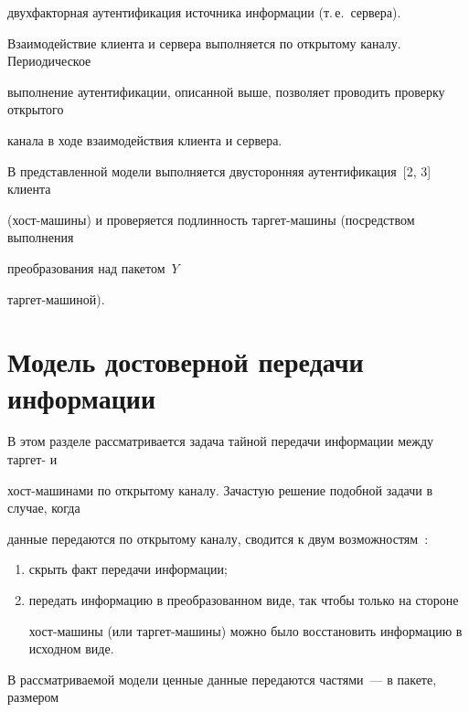 двухфакторная аутентификация источника информации (т.\,е.\ сервера).


    


    Взаимодействие клиента и сервера выполняется по открытому каналу. Периодическое 


выполнение аутентификации, описанной выше, позволяет проводить проверку открытого 


канала в ходе взаимодействия клиента и сервера.


    


    В представленной модели выполняется двусторонняя аутентификация~[2, 3] клиента 


(хост-ма\-ши\-ны) и проверяется подлинность таргет-машины (посредством выполнения 


преобразования над пакетом~$Y$ 


    тар\-гет-ма\-ши\-ной).





\section{Модель достоверной передачи информации}





    В этом разделе рассматривается задача тайной передачи информации между тар\-гет- и 


хост-машинами по открытому каналу. Зачастую решение подобной задачи в случае, когда 


данные передаются по открытому каналу, сводится к двум возможностям~\cite{8-pis}:


    \begin{enumerate}[(1)]


\item скрыть факт передачи информации;


\item передать информацию в преобразованном виде, так чтобы только на стороне 


хост-машины (или таргет-машины) можно было восстановить информацию в исходном виде.


\end{enumerate}





    В рассматриваемой модели ценные данные передаются частями~--- в пакете, размером 



